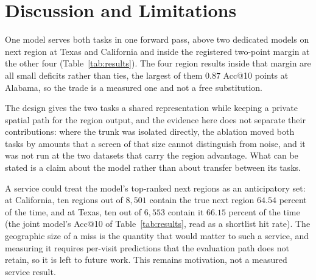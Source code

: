 \section{Discussion and Limitations}
\label{sec:discussion}

One model serves both tasks in one forward pass, above two dedicated models on next region at Texas
and California and inside the registered two-point margin at the other four
(Table~\ref{tab:results}). The four region results inside that margin are all small deficits rather than ties,
the largest of them $0.87$ Acc@10 points at Alabama, so the trade is a measured one and not a free
substitution.

The design gives the two tasks a shared representation while keeping a private spatial path for the
region output, and the evidence here does not separate their contributions: where the trunk was
isolated directly, the ablation moved both tasks by amounts that a screen of that size cannot
distinguish from noise, and it was not run at the two datasets that carry the region advantage.
What can be stated is a claim about the model rather than about transfer between its tasks.


A service could treat the model's top-ranked next regions as an anticipatory set: at California,
ten regions out of $8{,}501$ contain the true next region $64.54$ percent of the time, and at
Texas, ten out of $6{,}553$ contain it $66.15$ percent of the time (the joint model's Acc@10 of
Table~\ref{tab:results}, read as a shortlist hit rate). The geographic size of a miss is the
quantity that would matter to such a service, and measuring it requires per-visit predictions that
the evaluation path does not retain, so it is left to future work. This remains motivation, not a
measured service result.


